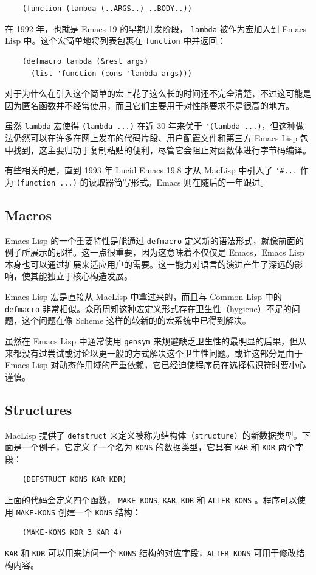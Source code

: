 \documentclass[format=acmsmall,screen]{acmart}
\begin{document}
%
\begin{verbatim}
    (function (lambda (..ARGS..) ..BODY..))
\end{verbatim}
%
在 1992 年，也就是 Emacs 19 的早期开发阶段， \texttt{lambda} 被作为宏加入到 Emacs Lisp 中。这个宏简单地将列表包裹在 \texttt{function} 中并返回：
\begin{verbatim}
    (defmacro lambda (&rest args)
      (list 'function (cons 'lambda args)))
\end{verbatim}

对于为什么在引入这个简单的宏上花了这么长的时间还不完全清楚，不过这可能是因为匿名函数并不经常使用，而且它们主要用于对性能要求不是很高的地方。

虽然 \texttt{lambda} 宏使得 \texttt{(lambda ...)} 在近 30 年来优于 \verb|'|\texttt{(lambda ...)}，但这种做法仍然可以在许多在网上发布的代码片段、用户配置文件和第三方 Emacs Lisp 包中找到，这主要归功于复制粘贴的便利，尽管它会阻止对函数体进行字节码编译。

有些相关的是，直到 1993 年 Lucid Emacs 19.8 才从 MacLisp 中引入了 \verb|'#...| 作为 \texttt{(function ...)} 的读取器简写形式。Emacs 则在随后的一年跟进。

\subsection{Macros}
\label{sec:macros}

Emacs Lisp 的一个重要特性是能通过 \texttt{defmacro} 定义新的语法形式，就像前面的例子所展示的那样。这一点很重要，因为这意味着不仅仅是 Emacs，Emacs Lisp 本身也可以通过扩展来适应用户的需要。这一能力对语言的演进产生了深远的影响，使其能独立于核心构造发展。

Emacs Lisp 宏是直接从 MacLisp 中拿过来的，而且与 Common Lisp 中的 \texttt{defmacro} 非常相似。众所周知这种宏定义形式存在卫生性（hygiene）不足的问题，这个问题在像 Scheme 这样的较新的的宏系统中已得到解决。

虽然在 Emacs Lisp 中通常使用 \texttt{gensym} 来规避缺乏卫生性的最明显的后果，但从来都没有过尝试或讨论以更一般的方式解决这个卫生性问题。或许这部分是由于 Emacs Lisp 对动态作用域的严重依赖，它已经迫使程序员在选择标识符时要小心谨慎。
\clearpage
\subsection{Structures}
\label{sec:structures}

MacLisp 提供了 \texttt{defstruct} 来定义被称为结构体（\texttt{structure}）的新数据类型。下面是一个例子，它定义了一个名为 \texttt{KONS} 的数据类型，它具有 \texttt{KAR} 和 \texttt{KDR} 两个字段：
%
\begin{verbatim}
    (DEFSTRUCT KONS KAR KDR)
\end{verbatim}
%
上面的代码会定义四个函数， \texttt{MAKE-KONS}, \texttt{KAR}, \texttt{KDR} 和 \texttt{ALTER-KONS} 。程序可以使用 \texttt{MAKE-KONS} 创建一个 \texttt{KONS} 结构：
%
\begin{verbatim}
    (MAKE-KONS KDR 3 KAR 4)
\end{verbatim}
%
\texttt{KAR} 和 \texttt{KDR} 可以用来访问一个 \texttt{KONS} 结构的对应字段，\texttt{ALTER-KONS} 可用于修改结构内容。
\end{document}
